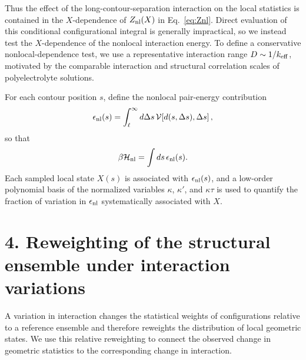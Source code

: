 \documentclass[11pt]{article}
\begin{document}
Thus the effect of the long-contour-separation interaction on the local statistics is contained in the \(X\)-dependence of \(Z_{\rm nl}(X)\) in Eq.~\eqref{eq:Znl}. Direct evaluation of this conditional configurational integral is generally impractical, so we instead test the \(X\)-dependence of the nonlocal interaction energy. To define a conservative nonlocal-dependence test, we use a representative interaction range \(D\sim1/k_{\rm eff}\), motivated by the comparable interaction and structural correlation scales of polyelectrolyte solutions.

For each contour position \(s\), define the nonlocal pair-energy contribution
\begin{equation}
\epsilon_{\rm nl}(s)
=
\int_\ell^\infty d\Delta s\,
\mathcal V\!\left[d(s,\Delta s),\Delta s\right],
\label{eq:epsilon_nl}
\end{equation}
so that
\begin{equation}
\beta\mathcal H_{\rm nl}
=
\int ds\,\epsilon_{\rm nl}(s).
\label{eq:Hnl_epsilon}
\end{equation}
Each sampled local state \(X(s)\) is associated with \(\epsilon_{\rm nl}(s)\), and a low-order polynomial basis of the normalized variables \(\kappa\), \(\kappa'\), and \(\kappa\tau\) is used to quantify the fraction of variation in \(\epsilon_{\rm nl}\) systematically associated with \(X\).


\section*{4. Reweighting of the structural ensemble under interaction variations}

A variation in interaction changes the statistical weights of configurations relative to a reference ensemble and therefore reweights the distribution of local geometric states. We use this relative reweighting to connect the observed change in geometric statistics to the corresponding change in interaction.
\end{document}
